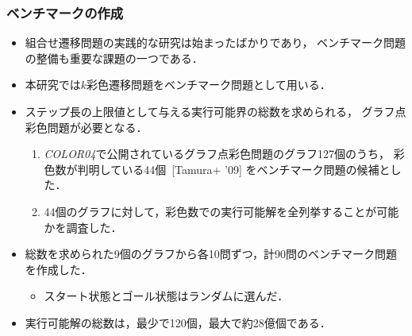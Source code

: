 \documentclass[dvipdfmx,11pt]{beamer}
\begin{document}
\begin{frame}\frametitle{ベンチマークの作成}

  \begin{itemize}
    \item 組合せ遷移問題の実践的な研究は始まったばかりであり，
          ベンチマーク問題の整備も重要な課題の一つである．
    \item 本研究では$k$彩色遷移問題をベンチマーク問題として用いる．
    \item ステップ長の上限値として与える実行可能界の総数を求められる，
          グラフ点彩色問題が必要となる．
          \begin{enumerate}
            \item \textit{COLOR04}で公開されているグラフ点彩色問題のグラフ127個のうち，
                  彩色数が判明している44個~[Tamura+ '09] をベンチマーク問題の候補とした．
            \item 44個のグラフに対して，彩色数での実行可能解を全列挙することが可能
                  かを調査した．
          \end{enumerate}
    \item 総数を求められた9個のグラフから各10問ずつ，計90問のベンチマーク問題を作成した．
          \begin{itemize}
            \item スタート状態とゴール状態はランダムに選んだ．
          \end{itemize}
    \item 実行可能解の総数は，最少で120個，最大で約28億個である．
  \end{itemize}
  
\end{frame}

\end{document}
